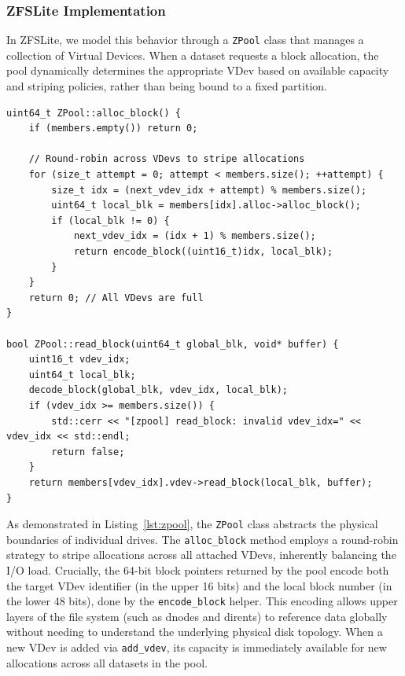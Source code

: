 \documentclass[pdflatex,sn-mathphys-num]{sn-jnl}
\begin{document}
\subsubsection{ZFSLite Implementation}

In ZFSLite, we model this behavior through a \verb+ZPool+ class that manages a collection of Virtual Devices. When a dataset requests a block allocation, the pool dynamically determines the appropriate VDev based on available capacity and striping policies, rather than being bound to a fixed partition.

\begin{lstlisting}[caption={Storage pool implementation: allocating and reading blocks.}, label={lst:zpool}]
uint64_t ZPool::alloc_block() {
    if (members.empty()) return 0;

    // Round-robin across VDevs to stripe allocations
    for (size_t attempt = 0; attempt < members.size(); ++attempt) {
        size_t idx = (next_vdev_idx + attempt) % members.size();
        uint64_t local_blk = members[idx].alloc->alloc_block();
        if (local_blk != 0) {
            next_vdev_idx = (idx + 1) % members.size();
            return encode_block((uint16_t)idx, local_blk);
        }
    }
    return 0; // All VDevs are full
}

bool ZPool::read_block(uint64_t global_blk, void* buffer) {
    uint16_t vdev_idx;
    uint64_t local_blk;
    decode_block(global_blk, vdev_idx, local_blk);
    if (vdev_idx >= members.size()) {
        std::cerr << "[zpool] read_block: invalid vdev_idx=" << vdev_idx << std::endl;
        return false;
    }
    return members[vdev_idx].vdev->read_block(local_blk, buffer);
}
\end{lstlisting}

As demonstrated in Listing~\ref{lst:zpool}, the \verb+ZPool+ class abstracts the physical boundaries of individual drives. The \verb+alloc_block+ method employs a round-robin strategy to stripe allocations across all attached VDevs, inherently balancing the I/O load. Crucially, the 64-bit block pointers returned by the pool encode both the target VDev identifier (in the upper 16 bits) and the local block number (in the lower 48 bits), done by the \verb+encode_block+ helper. This encoding allows upper layers of the file system (such as dnodes and dirents) to reference data globally without needing to understand the underlying physical disk topology. When a new VDev is added via \verb+add_vdev+, its capacity is immediately available for new allocations across all datasets in the pool.
\end{document}

